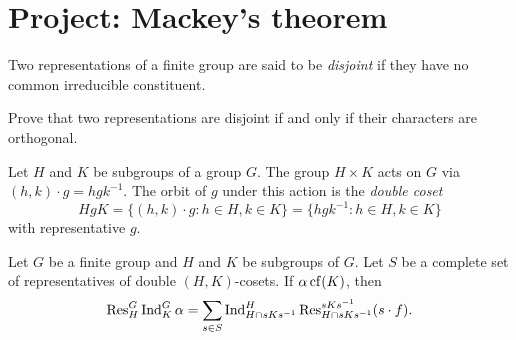 \section{Project: Mackey's theorem}

\begin{definition}
    Two representations of a finite group 
    are said to be \emph{disjoint} if they have no common 
    irreducible constituent. 
\end{definition}

\begin{exercise}
\label{xca:disjoint}
    Prove that 
    two representations are disjoint if and only if their characters are orthogonal. 
\end{exercise}

Let $H$ and $K$ be subgroups of a group $G$. 
The group $H\times K$ acts on $G$ via $(h,k)\cdot g=hgk^{-1}$. 
The orbit of $g$ under this action is 
the \emph{double coset} 
\[
HgK=\{(h,k)\cdot g:h\in H,k\in K\}
=\{hgk^{-1}:h\in H,k\in K\}
\]
with representative $g$. 

\begin{theorem}[Mackey]
\label{thm:Mackey}
    Let $G$ be a finite group and $H$ and $K$ be 
    subgroups of $G$. Let $S$ be a complete set 
    of representatives of double $(H,K)$-cosets. If $\alpha\operatorname{cf}(K)$, then 
    \[
    \operatorname{Res}_H^G\operatorname{Ind}_K^G\alpha=\sum_{s\in S}\operatorname{Ind}_{H\cap sKs^{-1}}^H\operatorname{Res}_{H\cap sKs^{-1}}^{sKs^{-1}}(s\cdot f).
    \]
\end{theorem}

